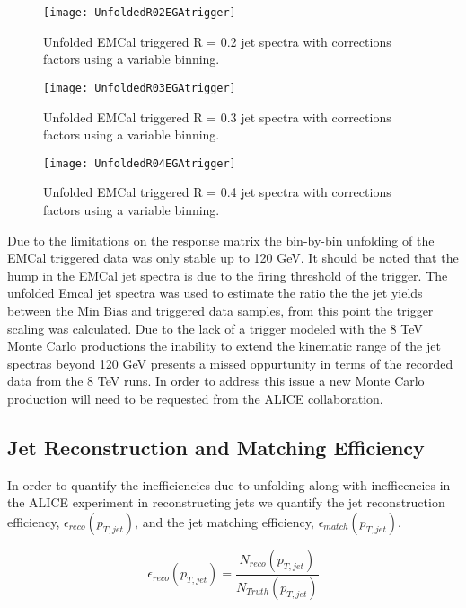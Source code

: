 \begin{figure}[h]
\texttt{[image: UnfoldedR02EGAtrigger]}
\centering
\caption{Unfolded EMCal triggered R = 0.2 jet spectra with corrections factors using a variable binning.}
\label{fig:UnfoldvarR02EGA}
\end{figure}

\begin{figure}[h]
\texttt{[image: UnfoldedR03EGAtrigger]}
\centering
\caption{Unfolded EMCal triggered R = 0.3 jet spectra with corrections factors using a variable binning.}
\label{fig:UnfoldvarR03EGA}
\end{figure}

\begin{figure}[h]
\texttt{[image: UnfoldedR04EGAtrigger]}
\centering
\caption{Unfolded EMCal triggered R = 0.4 jet spectra with corrections factors using a variable binning.}
\label{fig:UnfoldvarR04EGA}
\end{figure}

\noindent
Due to the limitations on the response matrix the bin-by-bin unfolding of the EMCal triggered data was only stable up to 120 GeV.  It should be noted that the hump in the EMCal jet spectra is due to the firing threshold of the trigger.  The unfolded Emcal jet spectra was used to estimate the ratio the the jet yields between the Min Bias and triggered data samples, from this point the trigger scaling was calculated.  Due to the lack of a trigger modeled with the 8 TeV Monte Carlo productions the inability to extend the kinematic range of the jet spectras beyond 120 GeV presents a missed oppurtunity in terms of the recorded data from the 8 TeV runs.  In order to address this issue a new Monte Carlo production will need to be requested from the ALICE collaboration.

\subsection{Jet Reconstruction and Matching Efficiency}
In order to quantify the inefficiencies due to unfolding along with inefficencies in the ALICE experiment in reconstructing jets we quantify the jet reconstruction efficiency, $\epsilon_{reco} (p_{T, jet})$, and the jet matching efficiency, $\epsilon_{match} (p_{T, jet})$.

\begin{equation}
 \epsilon_{reco} (p_{T, jet}) = \frac{N_{reco}(p_{T, jet}) }{N_{Truth} (p_{T, jet})}
\label{eq:jetrecoeff}
\end{equation}


